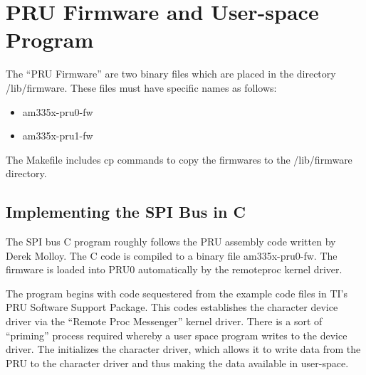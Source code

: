 %
%
%

\chapter{PRU Firmware and User-space Program}

The ``PRU Firmware'' are two binary files which are placed in the directory /lib/firmware.
These files must have specific names as follows:

\begin{itemize}
	\item am335x-pru0-fw
	\item am335x-pru1-fw
\end{itemize}

The Makefile includes cp commands to copy the firmwares to the /lib/firmware directory.

\section{Implementing the SPI Bus in C}

The SPI bus C program roughly follows the PRU assembly code written by Derek Molloy.  The C code is compiled to a binary file am335x-pru0-fw. The firmware is loaded into PRU0 automatically by the remoteproc kernel driver.

The program begins with code sequestered from the example code files in TI's PRU Software
Support Package.  This codes establishes the character device driver via the ``Remote Proc Messenger''
kernel driver.  There is a sort of ``priming'' process required whereby a user space program writes
to the device driver.  The initializes the character driver, which allows it to write data from
the PRU to the character driver and thus making the data available in user-space.

